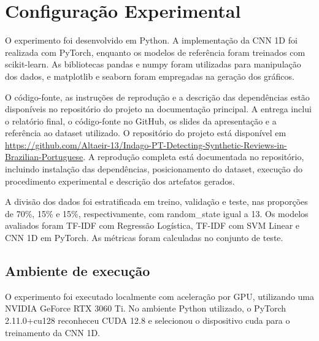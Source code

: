 \documentclass[12pt,a4paper]{article}
\begin{document}
\section{Configuração Experimental}

O experimento foi desenvolvido em Python. A implementação da CNN 1D foi realizada com PyTorch, enquanto os modelos de referência foram treinados com scikit-learn. As bibliotecas pandas e numpy foram utilizadas para manipulação dos dados, e matplotlib e seaborn foram empregadas na geração dos gráficos.

O código-fonte, as instruções de reprodução e a descrição das dependências estão disponíveis no repositório do projeto na documentação principal. A entrega inclui o relatório final, o código-fonte no GitHub, os slides da apresentação e a referência ao dataset utilizado. O repositório do projeto está disponível em \url{https://github.com/Altaeir-13/Indago-PT-Detecting-Synthetic-Reviews-in-Brazilian-Portuguese}. A reprodução completa está documentada no repositório, incluindo instalação das dependências, posicionamento do dataset, execução do procedimento experimental e descrição dos artefatos gerados.

A divisão dos dados foi estratificada em treino, validação e teste, nas proporções de 70\%, 15\% e 15\%, respectivamente, com random\_state igual a 13. Os modelos avaliados foram TF-IDF com Regressão Logística, TF-IDF com SVM Linear e CNN 1D em PyTorch. As métricas foram calculadas no conjunto de teste.

\subsection{Ambiente de execução}

O experimento foi executado localmente com aceleração por GPU, utilizando uma NVIDIA GeForce RTX 3060 Ti. No ambiente Python utilizado, o PyTorch 2.11.0+cu128 reconheceu CUDA 12.8 e selecionou o dispositivo cuda para o treinamento da CNN 1D.
\end{document}
